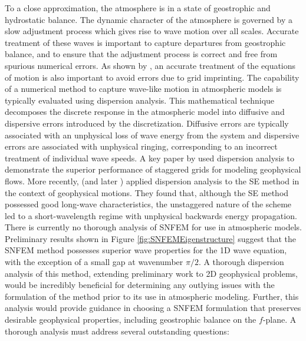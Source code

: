 \documentclass[11pt]{article}
\begin{document}
To a close approximation, the atmosphere is in a state of geostrophic and hydrostatic balance.  The dynamic character of the atmosphere is governed by a slow adjustment process which gives rise to wave motion over all scales.  Accurate treatment of these waves is important to capture departures from geostrophic balance, and to ensure that the adjustment process is correct and free from spurious numerical errors.  As shown by \cite{PHLCJMATRDN2010JAMES}, an accurate treatment of the equations of motion is also important to avoid errors due to grid imprinting.  The capability of a numerical method to capture wave-like motion in atmospheric models is typically evaluated using dispersion analysis.  This mathematical technique decomposes the discrete response in the atmospheric model into diffusive and dispersive errors introduced by the discretization.  Diffusive errors are typically associated with an unphysical loss of wave energy from the system and dispersive errors are associated with unphysical ringing, corresponding to an incorrect treatment of individual wave speeds.  A key paper by \cite{DAR1994MWR} used dispersion analysis to demonstrate the superior performance of staggered grids for modeling geophysical flows.  More recently, \cite{MAHAW2009SIAMJNA} (and later \cite{TMASJT2012QJRMS}) applied dispersion analysis to the SE method in the context of geophysical motions.  They found that, although the SE method possessed good long-wave characteristics, the unstaggered nature of the scheme led to a short-wavelength regime with unphysical backwards energy propagation.  There is currently no thorough analysis of SNFEM for use in atmospheric models.  Preliminary results shown in Figure \ref{fig:SNFEMEigenstructure} suggest that the SNFEM method possesses superior wave properties for the 1D wave equation, with the exception of a small gap at wavenumber $\pi / 2$.  A thorough dispersion analysis of this method, extending preliminary work to 2D geophysical problems, would be incredibly beneficial for determining any outlying issues with the formulation of the method prior to its use in atmospheric modeling.  Further, this analysis would provide guidance in choosing a SNFEM formulation that preserves desirable geophysical properties, including geostrophic balance on the $f$-plane.  A thorough analysis must address several outstanding questions:
\end{document}
